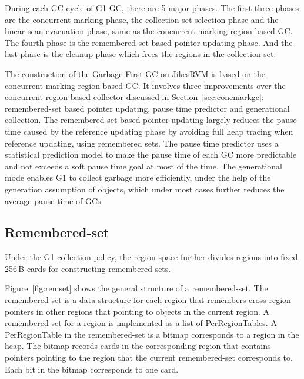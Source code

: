 During each GC cycle of G1 GC, there are 5 major phases.
The first three phases are the concurrent marking phase, the collection
set selection phase and the linear scan evacuation phase,
same as the concurrent-marking region-based GC.
The fourth phase is the remembered-set based pointer updating phase.
And the last phase is the cleanup phase which frees the regions in the collection set.

The construction of the Garbage-First GC on JikesRVM is based on the concurrent-marking
region-based GC.
It involves three improvements over the concurrent region-based collector discussed in Section~\ref{sec:concmarkgc}:
remembered-set based pointer updating, pause time predictor and generational collection.
The remembered-set based pointer updating largely reduces the pause time caused by
the reference updating phase by avoiding full heap tracing when reference updating,
using remembered sets. The pause time predictor uses a statistical prediction model to make the pause time of each
GC more predictable and not exceeds a soft pause time goal at most of the time.
The generational mode enables G1 to collect garbage more efficiently, under the help
of the generation assumption of objects, which under most cases
further reduces the average pause  time of GCs

\subsection{Remembered-set}

Under the G1 collection policy, the region space further divides regions into fixed 256\,B cards for constructing remembered sets.

Figure~\ref{fig:remset} shows the general structure of a remembered-set. The remembered-set is a data structure for each region that remembers cross
region pointers in other regions that pointing to objects in the current region.
A remembered-set for a region is implemented as a list of PerRegionTables.
A PerRegionTable in the remembered-set is a bitmap corresponds to a region in the heap.
The bitmap records cards in the corresponding region that contains pointers pointing to the
region that the current remembered-set corresponds to. Each bit in the bitmap corresponds to one card.

\begin{figure*}
  \centering
  \texttt{[image: \{figs/remset.png]}}
  \caption{Remembered-Set Structure}
  \label{fig:remset}
\end{figure*}

